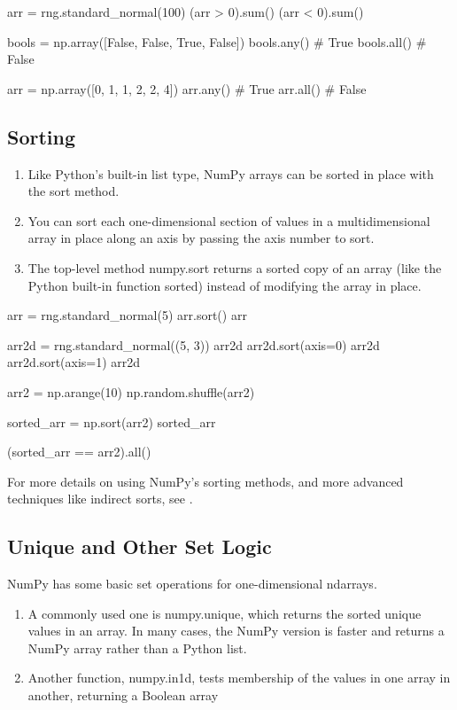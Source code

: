 \begin{pyc}
arr = rng.standard_normal(100)
(arr > 0).sum()
(arr < 0).sum()

bools = np.array([False, False, True, False])
bools.any()
# True
bools.all()
# False

arr = np.array([0, 1, 1, 2, 2, 4])
arr.any()
# True
arr.all()
# False
\end{pyc}
\subsection{Sorting}
\begin{enumerate}
    \item Like Python's built-in list type, NumPy arrays can be sorted in place with the sort method.
    \item You can sort each one-dimensional section of values in a multidimensional array in place along an axis by passing the axis number to sort.
    \item The top-level method numpy.sort returns a sorted copy of an array (like the Python built-in function sorted) instead of modifying the array in place. 
\end{enumerate}

\begin{pyc}
arr = rng.standard_normal(5)
arr.sort()
arr

arr2d = rng.standard_normal((5, 3))
arr2d
arr2d.sort(axis=0)
arr2d
arr2d.sort(axis=1)
arr2d

arr2 = np.arange(10)
np.random.shuffle(arr2)

sorted_arr = np.sort(arr2)
sorted_arr

(sorted_arr == arr2).all()
\end{pyc}


For more details on using NumPy's sorting methods, and more advanced techniques like indirect sorts, see .
\subsection{Unique and Other Set Logic}
NumPy has some basic set operations for one-dimensional ndarrays.

\begin{enumerate}
    \item A commonly used one is numpy.unique, which returns the sorted unique values in an array. In many cases, the NumPy version is faster and returns a NumPy array rather than a
    Python list.    
    \item Another function, numpy.in1d, tests membership of the values in one array in another, returning a Boolean array
\end{enumerate}

